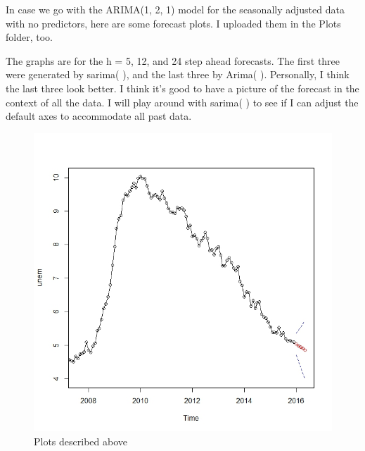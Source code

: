 \documentclass[twoside,twocolumn]{article}
\begin{document}
In case we go with the ARIMA(1, 2, 1) model for the seasonally adjusted data with no predictors, here are some forecast plots. I uploaded them in the Plots folder, too.

The graphs are for the h = 5, 12, and 24 step ahead forecasts. The first three were generated by sarima( ), and the last three by Arima( ). Personally, I think the last three look better. I think it's good to have a picture of the forecast in the context of all the data. I will play around with sarima( ) to see if I can adjust the default axes to accommodate all past data.


 \begin{figure}[H]
    	\centering
     	\caption{Plots described above}
     	\includegraphics[width=.9\linewidth]{images/fore1}
 \end{figure}
 
\end{document}
